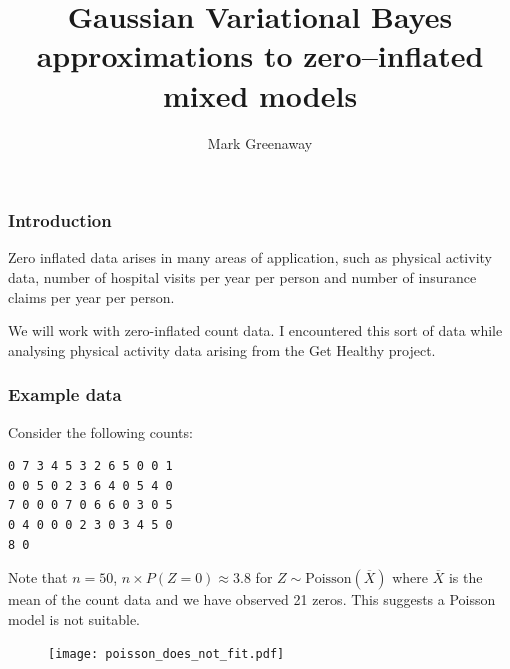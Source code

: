 \documentclass{beamer}
\title{Gaussian Variational Bayes approximations to zero--inflated mixed models}
\author{Mark Greenaway}
\begin{document}
\begin{frame}
	\titlepage
\end{frame}

\begin{frame}
	\frametitle{Introduction}
	Zero inflated data arises in many areas of application, such as physical
	activity data, number of hospital visits per year per person and
	number of insurance claims per year per person.
			
	\bigskip 
	We will work with zero-inflated count data. I encountered this sort of data 
	while analysing physical activity data arising from the Get Healthy project.
\end{frame}

\begin{frame}[fragile]
	\frametitle{Example data}
	Consider the following counts:
	\begin{verbatim}
0 7 3 4 5 3 2 6 5 0 0 1
0 0 5 0 2 3 6 4 0 5 4 0
7 0 0 0 7 0 6 6 0 3 0 5
0 4 0 0 0 2 3 0 3 4 5 0
8 0
	\end{verbatim}
			
	\noindent Note that $n=50$, 
	$n\times P(Z = 0) \approx 3.8$ for $Z\sim\mbox{Poisson}(\overline{X})$
	where $\overline{X}$ is the mean of the count data and we have observed 21 zeros. This suggests
	a Poisson model is not suitable.
			
	\begin{figure}
		\texttt{[image: poisson\_does\_not\_fit.pdf]}
	\end{figure}%
\end{frame}
\end{document}
